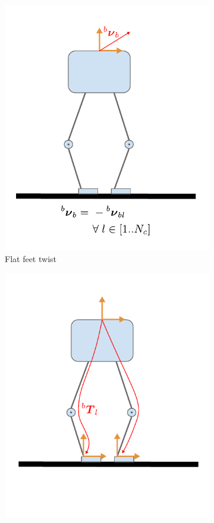 \begin{figure}
\begin{subfigure}{.33\linewidth}
        \includegraphics[width=\textwidth]{figures/robot_kinematic_types_flat_vel.pdf}
        \caption{Flat feet twist}
    \end{subfigure}%
        \hfill
    \begin{subfigure}{.33\linewidth}
        \centering
        \includegraphics[width=\textwidth]{figures/robot_kinematic_types_flat_direct.pdf}

\end{subfigure}
\end{figure}
